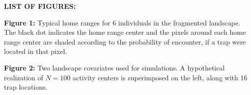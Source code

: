 \documentclass[12pt]{article}
\begin{document}

\newpage

{\flushleft \bf LIST OF FIGURES:}

\vspace{.2in}


{\flushleft \bf
Figure 1:}
Typical home ranges for 6 individuals in the fragmented landscape. %
The black dot indicates the home
  range center and the pixels around each home range center are shaded
according to the probability of encounter, if a trap were located in
that pixel.



\vspace{.2in}


{\flushleft \bf Figure 2:}
Two landscape covariates used for simulations. A hypothetical
  realization of $N=100$ activity centers is superimposed on the left,
along with 16 trap locations.


\newpage


\end{document}
